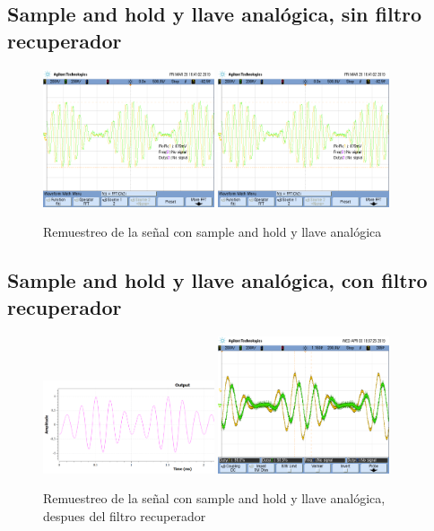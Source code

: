 \documentclass[../../ASSD_TP1_G7.tex]{subfiles}
\begin{document}
\subsection*{Sample and hold y llave analógica, sin filtro recuperador}
\begin{figure}[H]
\centering
{}
{\includegraphics[width=0.45\textwidth]{figures/syh_ptp_7re.png}}
{\includegraphics[width=0.45\textwidth]{figures/syh_ptp_7re.png}}
\caption{Remuestreo de la se\~nal con sample and hold y llave analógica}
\end{figure}

\subsection*{Sample and hold y llave analógica, con filtro recuperador}
\begin{figure}[H]
\centering
{}
{\includegraphics[width=0.45\textwidth]{figures/simlyh_pto_7_3.png}}
{\includegraphics[width=0.45\textwidth]{figures/lyh_pto_7_3.png}}
\caption{Remuestreo de la se\~nal con sample and hold y llave analógica, despues del filtro recuperador}
\end{figure}
\end{document}
